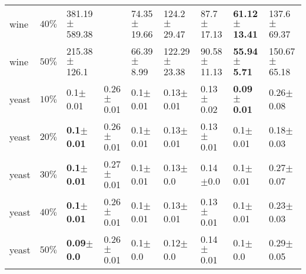 \begin{tabular}{lllllllll}
         wine &     $ 40\% $ &       381.19$\pm$589.38 &                 &          74.35$\pm$19.66 &          124.2$\pm$29.47 &  87.7$\pm$17.13 & \textbf{61.12$\pm$13.41} &   137.6$\pm$69.37 \\
         wine &     $ 50\% $ &        215.38$\pm$126.1 &                 &           66.39$\pm$8.99 &         122.29$\pm$23.38 & 90.58$\pm$11.13 &  \textbf{55.94$\pm$5.71} &  150.67$\pm$65.18 \\
        yeast &     $ 10\% $ &            0.1$\pm$0.01 &   0.26$\pm$0.01 &             0.1$\pm$0.01 &            0.13$\pm$0.01 &   0.13$\pm$0.02 &   \textbf{0.09$\pm$0.01} &     0.26$\pm$0.08 \\
        yeast &     $ 20\% $ &   \textbf{0.1$\pm$0.01} &   0.26$\pm$0.01 &             0.1$\pm$0.01 &            0.13$\pm$0.01 &   0.13$\pm$0.01 &             0.1$\pm$0.01 &     0.18$\pm$0.03 \\
        yeast &     $ 30\% $ &   \textbf{0.1$\pm$0.01} &   0.27$\pm$0.01 &             0.1$\pm$0.01 &             0.13$\pm$0.0 &    0.14$\pm$0.0 &             0.1$\pm$0.01 &     0.27$\pm$0.07 \\
        yeast &     $ 40\% $ &   \textbf{0.1$\pm$0.01} &   0.26$\pm$0.01 &             0.1$\pm$0.01 &            0.13$\pm$0.01 &   0.13$\pm$0.01 &             0.1$\pm$0.01 &     0.23$\pm$0.03 \\
        yeast &     $ 50\% $ &   \textbf{0.09$\pm$0.0} &   0.26$\pm$0.01 &              0.1$\pm$0.0 &             0.12$\pm$0.0 &   0.14$\pm$0.01 &              0.1$\pm$0.0 &     0.29$\pm$0.05 \\
\bottomrule
\end{tabular}


